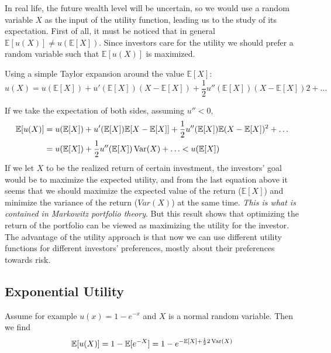 In real life, the future wealth level will be uncertain, so we would use a random variable $X$ as the input of the utility function, leading us to the study of its expectation. First of all, it must be noticed that in general $\mathbb{E}[u(X)] \neq u(\mathbb{E}[X])$.
Since investors care for the utility we should prefer a random variable such that $\mathbb{E}[u(X)]$ is maximized.

Using a simple Taylor expansion around the value $\mathbb{E}[X]$:
\begin{equation*}
u(X) = u (\mathbb{E}[X]) + u'(\mathbb{E}[X]) (X - \mathbb{E}[X]) + \frac{1}{2}u''(\mathbb{E}[X]) (X - \mathbb{E}[X])2 + \ldots
\end{equation*}

If we take the expectation of both sides, assuming $u'' < 0$,
\begin{equation*}
  \begin{aligned}
  \mathbb{E}[u(X)] &= u(\mathbb{E}[X]) + u'(\mathbb{E}[X]) \mathbb{E}[X-\mathbb{E}[X]] + \frac{1}{2}u''(\mathbb{E}[X]) \mathbb{E}(X-\mathbb{E}[X])^2 + \ldots\\
  &= u (\mathbb{E}[X]) + \frac{1}{2}u'' (\mathbb{E}[X]) \operatorname{Var}(X) + \ldots < u (\mathbb{E}[X])
  \end{aligned}
\end{equation*}
If we let $X$ to be the realized return of certain investment, the investors’ goal would be to maximize the expected utility, and from the last equation above it seems
that we should maximize the expected value of the return ($\mathbb{E}[X]$) and minimize the variance of the return ($Var(X)$) at the same time. \emph{This is what is contained in Markowitz portfolio theory}.
But this result shows that optimizing the return of the portfolio can be viewed as maximizing the utility for the investor. The
advantage of the utility approach is that now we can use different utility functions for different investors’ preferences, mostly about their preferences towards risk.

\subsection{Exponential Utility}
Assume for example $u(x) = 1-e^{-x}$ and $X$ is a normal random variable. Then we find
\begin{equation*}
  \mathbb{E}[u(X)] = 1-\mathbb{E}[e^{-X}] = 1-e^{-\mathbb{E}[X]+ \frac{1}{2}2\operatorname{Var}(X)}
\end{equation*}

